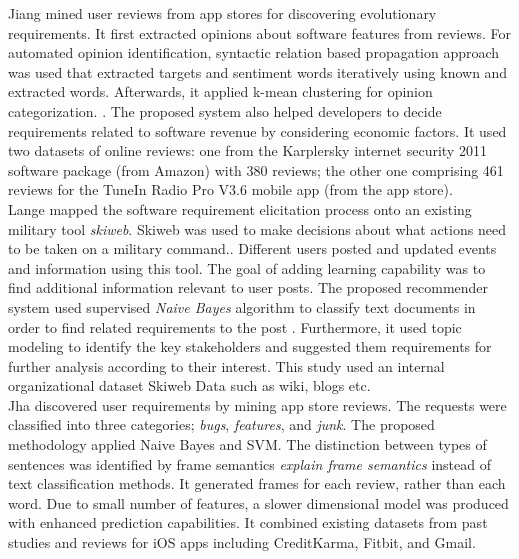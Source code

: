 Jiang \etal \cite{Jiang:2014} mined user reviews from 
app stores for discovering evolutionary requirements. It first extracted opinions about software features from reviews. For automated opinion identification, syntactic
relation based propagation approach was used that extracted targets and sentiment words
iteratively using known and extracted words. Afterwards, it applied k-mean clustering for opinion categorization.
. The proposed system also helped developers to decide requirements related to software revenue by considering economic factors.  It used two datasets of online reviews: one from the
Karplersky internet security 2011 software package (from Amazon) with 380
reviews; the other one comprising 461 reviews for the  TuneIn Radio Pro V3.6
mobile app (from the app store).\\

Lange \etal\cite{Douglas:S2008} mapped the software requirement elicitation
process onto an existing military tool \emph{skiweb}. Skiweb was used to make decisions about what actions need to be taken on a military command.. Different users posted and updated events and information using this tool. The goal of adding learning capability was to find additional information relevant to user posts. The proposed recommender system used supervised
\emph{Naive Bayes} algorithm to classify text documents in order to find related
requirements to the post . Furthermore, it
 used topic modeling to identify the key
stakeholders and suggested them requirements for further analysis according to their interest. This study used an internal organizational
dataset Skiweb Data such as wiki, blogs etc.\\

Jha \etal \cite{Jha:2017} discovered user requirements by mining app store reviews. The requests were classified into three categories;
\emph{bugs}, \emph{features}, and \emph{junk}. The proposed methodology applied Naive Bayes and SVM. The distinction between types of sentences was identified by frame semantics \emph{explain frame semantics} instead of text classification methods. It generated frames for each review, rather than each word. Due to small number of features, a slower dimensional model was produced with enhanced prediction capabilities. It combined existing
datasets from past studies and reviews for iOS apps including CreditKarma,
Fitbit, and Gmail.

